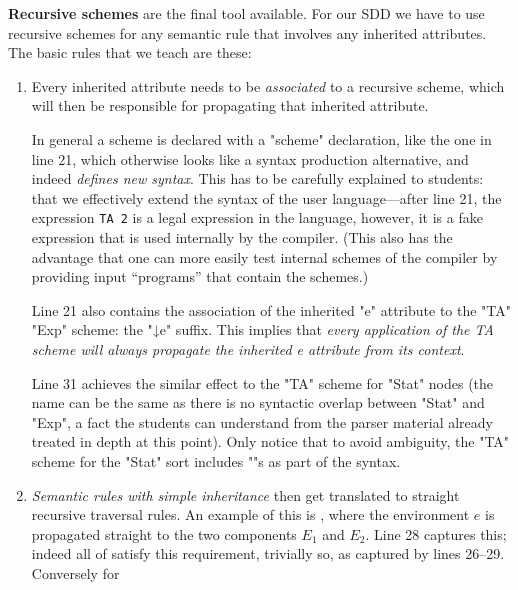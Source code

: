 \documentclass{article}
\begin{document}
\smallskip\noindent\textbf{Recursive schemes} are the final tool available. For our SDD we have to use recursive schemes
  for any semantic rule that involves any inherited attributes.  The basic rules that we teach are
  these:
  \begin{enumerate}

  \item Every inherited attribute needs to be \emph{associated} to a recursive scheme, which will
    then be responsible for propagating that inherited attribute.

    In general a scheme is declared with a "scheme" declaration, like the one in line 21, which
    otherwise looks like a syntax production alternative, and indeed \emph{defines new syntax}.
    This has to be carefully explained to students: that we effectively extend the syntax of the
    user language---after line 21, the expression \texttt{TA 2} is a legal expression in the
    language, however, it is a fake expression that is used internally by the compiler.  (This also
    has the advantage that one can more easily test internal schemes of the compiler by providing
    input ``programs'' that contain the schemes.)

    Line 21 also contains the association of the inherited "e" attribute to the "TA" "Exp" scheme:
    the "↓e" suffix.  This implies that \emph{every application of the TA scheme will always
      propagate the inherited e attribute from its context}.

    Line 31 achieves the similar effect to the "TA" scheme for "Stat" nodes (the name can be the
    same as there is no syntactic overlap between "Stat" and "Exp", a fact the students can
    understand from the parser material already treated in depth at this point).  Only notice that
    to avoid ambiguity, the "TA" scheme for the "Stat" sort includes "{}"s as part of the syntax.

  \item \emph{Semantic rules with simple inheritance} then get translated to straight recursive traversal
    rules.  An example of this is , where the environment $e$ is propagated straight to
    the two components $E_1$ and $E_2$. Line 28 captures this; indeed all of  satisfy
    this requirement,  trivially so, as captured by lines 26--29.  Conversely for 


\end{enumerate}
\end{document}
